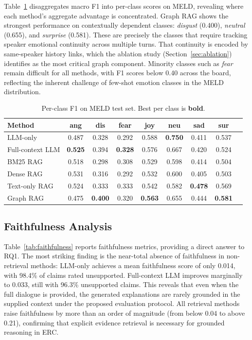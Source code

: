 \documentclass[runningheads]{llncs}
\begin{document}
Table~\ref{tab:perclass} disaggregates macro F1 into per-class scores on MELD,
revealing where each method's aggregate advantage is concentrated.
Graph RAG shows the strongest performance on contextually dependent
classes: \textit{disgust} (0.400), \textit{neutral} (0.655), and
\textit{surprise} (0.581). These are precisely the classes that require
tracking speaker emotional continuity across multiple turns. That continuity
is encoded by same-speaker history links, which the ablation study
(Section~\ref{sec:ablation}) identifies as the most critical graph component.
Minority classes such as \textit{fear} remain difficult for all methods,
with F1 scores below 0.40 across the board, reflecting the inherent
challenge of few-shot emotion classes in the MELD distribution.

\begin{table}
\centering
\caption{Per-class F1 on MELD test set. Best per class is \textbf{bold}.}
\label{tab:perclass}
\begin{tabular}{lcccccccc}
\toprule
Method & ang & dis & fear & joy & neu & sad & sur \\
\midrule
LLM-only         & 0.487 & 0.328 & 0.292 & 0.588 & \textbf{0.750} & 0.411 & 0.537 \\
Full-context LLM & \textbf{0.525} & 0.394 & \textbf{0.328} & 0.576 & 0.667 & 0.420 & 0.524 \\
BM25 RAG         & 0.518 & 0.298 & 0.308 & 0.529 & 0.598 & 0.414 & 0.504 \\
Dense RAG        & 0.531 & 0.316 & 0.292 & 0.532 & 0.600 & 0.405 & 0.503 \\
Text-only RAG    & 0.524 & 0.333 & 0.333 & 0.542 & 0.582 & \textbf{0.478} & 0.569 \\
Graph RAG        & 0.475 & \textbf{0.400} & 0.320 & \textbf{0.563} & 0.655 & 0.444 & \textbf{0.581} \\
\bottomrule
\end{tabular}
\end{table}

\subsection{Faithfulness Analysis}
\label{sec:faith-results}

Table~\ref{tab:faithfulness} reports faithfulness metrics, providing
a direct answer to RQ1. The most striking finding is the near-total
absence of faithfulness in non-retrieval methods: LLM-only achieves a
mean faithfulness score of only 0.014, with 98.4\% of claims rated
unsupported. Full-context LLM improves marginally to 0.033, still with
96.3\% unsupported claims. This reveals that even when the full dialogue is provided, the
generated explanations are rarely grounded in the supplied context
under the proposed evaluation protocol. All retrieval
methods raise faithfulness by more than an order of magnitude (from
below 0.04 to above 0.21), confirming that explicit evidence retrieval
is necessary for grounded reasoning in ERC.
\end{document}
